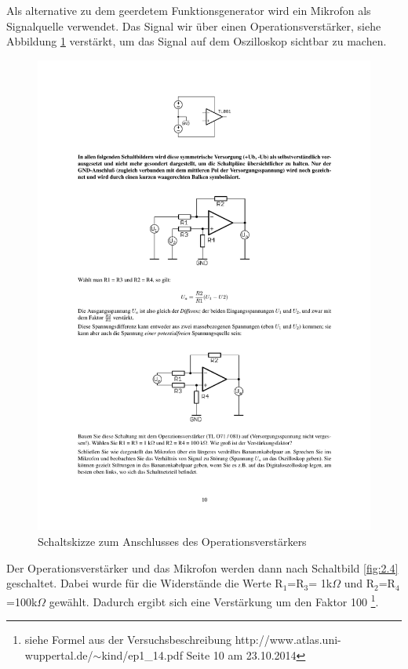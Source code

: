 \documentclass[12pt,a4paper]{article}
\begin{document}
Als alternative zu dem geerdetem Funktionsgenerator wird ein Mikrofon als Signalquelle verwendet. Das Signal wir über einen Operationsverstärker, siehe Abbildung \ref{fig:2.33} verstärkt, um das Signal auf dem Oszilloskop sichtbar zu machen.

\begin{figure}[H] 
  \centering
    \includegraphics[trim = 10mm 240mm 10mm 15mm, clip, scale = 1]{Op-Amp.pdf}
  	\caption[Schaltskizze zum Anschlusses des Operationsverstärkers]{Schaltskizze zum Anschlusses des Operationsverstärkers\footnotemark}
  \label{fig:2.33}
\end{figure}

Der Operationsverstärker und das Mikrofon werden dann nach Schaltbild \ref{fig:2.4} geschaltet.
Dabei wurde für die Widerstände die Werte R$_1$=R$_3$= 1k$\Omega$ und R$_2$=R$_4$=100k$\Omega$ gewählt. Dadurch ergibt sich eine Verstärkung um den Faktor 100 \footnote{siehe Formel aus der Versuchsbeschreibung http://www.atlas.uni-wuppertal.de/$\sim$kind/ep1\_14.pdf Seite 10 am 23.10.2014}.
\end{document}

